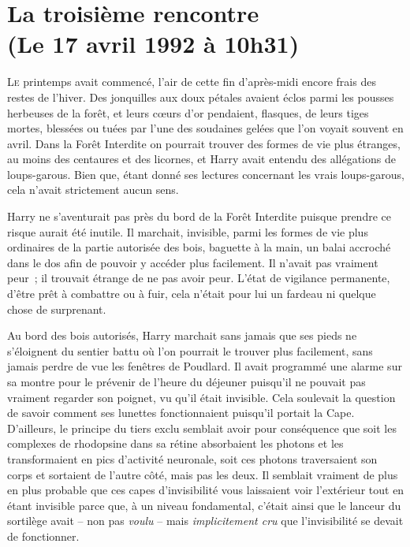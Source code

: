 
\section{La troisième rencontre\\
(Le 17 avril 1992 à 10h31)}

\lettrine{L}{e} printemps avait commencé, l'air de cette fin d'après-midi encore frais des restes de l'hiver. Des jonquilles aux doux pétales avaient éclos parmi les pousses herbeuses de la forêt, et leurs cœurs d'or pendaient, flasques, de leurs tiges mortes, blessées ou tuées par l'une des soudaines gelées que l'on voyait souvent en avril. Dans la Forêt Interdite on pourrait trouver des formes de vie plus étranges, au moins des centaures et des licornes, et Harry avait entendu des allégations de loups-garous. Bien que, étant donné ses lectures concernant les vrais loups-garous, cela n'avait strictement aucun sens.

Harry ne s'aventurait pas près du bord de la Forêt Interdite puisque prendre ce risque aurait été inutile. Il marchait, invisible, parmi les formes de vie plus ordinaires de la partie autorisée des bois, baguette à la main, un balai accroché dans le dos afin de pouvoir y accéder plus facilement. Il n'avait pas vraiment peur~; il trouvait étrange de ne pas avoir peur. L'état de vigilance permanente, d'être prêt à combattre ou à fuir, cela n'était pour lui un fardeau ni quelque chose de surprenant.

Au bord des bois autorisés, Harry marchait sans jamais que ses pieds ne s'éloignent du sentier battu où l'on pourrait le trouver plus facilement, sans jamais perdre de vue les fenêtres de Poudlard. Il avait programmé une alarme sur sa montre pour le prévenir de l'heure du déjeuner puisqu'il ne pouvait pas vraiment regarder son poignet, vu qu'il était invisible. Cela soulevait la question de savoir comment ses lunettes fonctionnaient puisqu'il portait la Cape. D'ailleurs, le principe du tiers exclu semblait avoir pour conséquence que soit les complexes de rhodopsine dans sa rétine absorbaient les photons et les transformaient en pics d'activité neuronale, soit ces photons traversaient son corps et sortaient de l'autre côté, mais pas les deux. Il semblait vraiment de plus en plus probable que ces capes d'invisibilité vous laissaient voir l'extérieur tout en étant invisible parce que, à un niveau fondamental, c'était ainsi que le lanceur du sortilège avait -- non pas \emph{voulu} -- mais \emph{implicitement cru} que l'invisibilité se devait de fonctionner.


